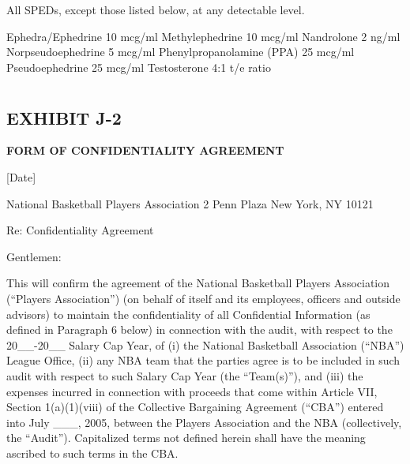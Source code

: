 \documentclass[
]{book}
\begin{document}
All SPEDs, except those listed below, at any detectable level.

Ephedra/Ephedrine 10 mcg/ml
Methylephedrine 10 mcg/ml
Nandrolone 2 ng/ml
Norpseudoephedrine 5 mcg/ml
Phenylpropanolamine (PPA) 25 mcg/ml
Pseudoephedrine 25 mcg/ml
Testosterone 4:1 t/e ratio

\hypertarget{section-1}{%
\chapter{}\label{section-1}}

\hypertarget{exhibit-j-2}{%
\section{EXHIBIT J-2}\label{exhibit-j-2}}

\textbf{FORM OF CONFIDENTIALITY AGREEMENT}

{[}Date{]}

National Basketball Players Association
2 Penn Plaza
New York, NY 10121

Re: Confidentiality Agreement

Gentlemen:

This will confirm the agreement of the National Basketball Players Association (``Players Association'') (on behalf of itself and its employees, officers and outside advisors) to maintain the confidentiality of all Confidential Information (as defined in Paragraph 6 below) in connection with the audit, with respect to the 20\_\_-20\_\_ Salary Cap Year, of (i) the National Basketball Association (``NBA'') League Office, (ii) any NBA team that the parties agree is to be included in such audit with respect to such Salary Cap Year (the ``Team(s)''), and (iii) the expenses incurred in connection with proceeds that come within Article VII, Section 1(a)(1)(viii) of the Collective Bargaining Agreement (``CBA'') entered into July \_\_\_, 2005, between the Players Association and the NBA (collectively, the ``Audit''). Capitalized terms not defined herein shall have the meaning ascribed to such terms in the CBA.
\end{document}
